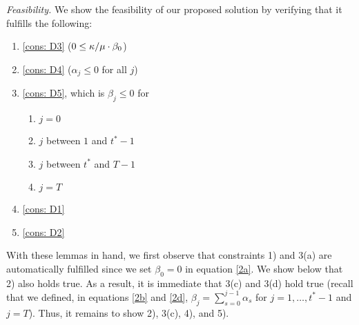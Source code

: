    
    \emph{Feasibility.} 
    We show the feasibility of our proposed solution by verifying that it fulfills the following:
    \begin{enumerate}
        \item \ref{cons: D3}  ($0\leq \kappa/\mu \cdot \beta_0$)
        \item \ref{cons: D4} ($\alpha_j\leq 0$ for all $j$)
        \item \ref{cons: D5}, which is $\beta_j\leq 0$ for
        \begin{enumerate}
            \item  $j=0$
            \item  $j$ between $1$ and {$t^*-1$}
            \item  $j$ between $t^*$ and $T-1$
            \item  $j=T$
        \end{enumerate}
        \item \ref{cons: D1}
        \item \ref{cons: D2}
    \end{enumerate} 
    With these lemmas in hand, we first observe that constraints 1) and 3(a) are automatically fulfilled since we set $\beta_0=0$ in equation \eqref{2a}. We show below that 2) also holds true. As a result, it is immediate that 3(c) and 3(d) hold true (recall that we defined, in equations \eqref{2b} and \eqref{2d}, $\beta_j=\sum_{s=0}^{j-1}\alpha_s$ for $j=1,\ldots, {t^*-1}$ and $j=T$). Thus, it remains to show 2), 3(c), 4), and 5).
    

